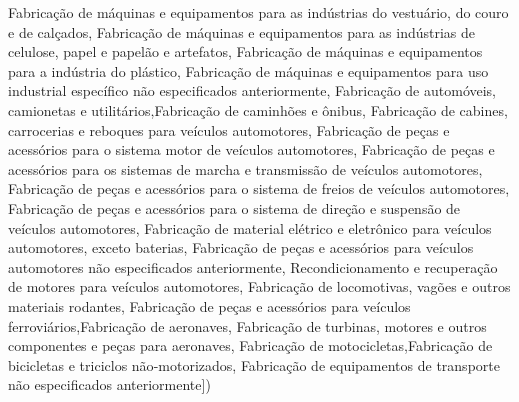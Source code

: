 \documentclass[
  12,
  dvipsnames]{article}
\newenvironment{Shaded}{\begin{snugshade}}{\end{snugshade}}
\newcommand{\NormalTok}[1]{#1}
\newcommand{\StringTok}[1]{\textcolor[rgb]{0.31,0.60,0.02}{#1}}
\begin{document}
\begin{Shaded}
\begin{Highlighting}[]
    \StringTok{\textquotesingle{}Fabricação de máquinas e equipamentos para as indústrias do vestuário, do couro e de calçados\textquotesingle{}}\NormalTok{,}
    \StringTok{\textquotesingle{}Fabricação de máquinas e equipamentos para as indústrias de celulose, papel e papelão e artefatos\textquotesingle{}}\NormalTok{,}
    \StringTok{\textquotesingle{}Fabricação de máquinas e equipamentos para a indústria do plástico\textquotesingle{}}\NormalTok{,}
    \StringTok{\textquotesingle{}Fabricação de máquinas e equipamentos para uso industrial específico não especificados anteriormente\textquotesingle{}}\NormalTok{,}
    \StringTok{\textquotesingle{}Fabricação de automóveis, camionetas e utilitários\textquotesingle{}}\NormalTok{,}\StringTok{\textquotesingle{}Fabricação de caminhões e ônibus\textquotesingle{}}\NormalTok{,}
    \StringTok{\textquotesingle{}Fabricação de cabines, carrocerias e reboques para veículos automotores\textquotesingle{}}\NormalTok{,}
    \StringTok{\textquotesingle{}Fabricação de peças e acessórios para o sistema motor de veículos automotores\textquotesingle{}}\NormalTok{,}
    \StringTok{\textquotesingle{}Fabricação de peças e acessórios para os sistemas de marcha e transmissão de veículos automotores\textquotesingle{}}\NormalTok{,}
    \StringTok{\textquotesingle{}Fabricação de peças e acessórios para o sistema de freios de veículos automotores\textquotesingle{}}\NormalTok{,}
    \StringTok{\textquotesingle{}Fabricação de peças e acessórios para o sistema de direção e suspensão de veículos automotores\textquotesingle{}}\NormalTok{,}
    \StringTok{\textquotesingle{}Fabricação de material elétrico e eletrônico para veículos automotores, exceto baterias\textquotesingle{}}\NormalTok{,}
    \StringTok{\textquotesingle{}Fabricação de peças e acessórios para veículos automotores não especificados anteriormente\textquotesingle{}}\NormalTok{,}
    \StringTok{\textquotesingle{}Recondicionamento e recuperação de motores para veículos automotores\textquotesingle{}}\NormalTok{,}
    \StringTok{\textquotesingle{}Fabricação de locomotivas, vagões e outros materiais rodantes\textquotesingle{}}\NormalTok{,}
    \StringTok{\textquotesingle{}Fabricação de peças e acessórios para veículos ferroviários\textquotesingle{}}\NormalTok{,}\StringTok{\textquotesingle{}Fabricação de aeronaves\textquotesingle{}}\NormalTok{,}
    \StringTok{\textquotesingle{}Fabricação de turbinas, motores e outros componentes e peças para aeronaves\textquotesingle{}}\NormalTok{,}
    \StringTok{\textquotesingle{}Fabricação de motocicletas\textquotesingle{}}\NormalTok{,}\StringTok{\textquotesingle{}Fabricação de bicicletas e triciclos não{-}motorizados\textquotesingle{}}\NormalTok{,}
    \StringTok{\textquotesingle{}Fabricação de equipamentos de transporte não especificados anteriormente\textquotesingle{}}\NormalTok{])}


\end{Highlighting}
\end{Shaded}
\end{document}
